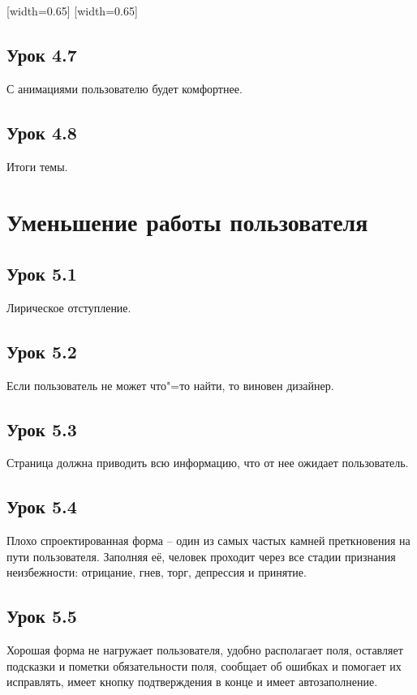 \documentclass[variant=practice]{bsuir}
\begin{document}
[width=0.65\textwidth]
[width=0.65\textwidth]

\subsection{Урок 4.7} С анимациями пользователю будет комфортнее.

\subsection{Урок 4.8} Итоги темы.

\section{Уменьшение работы пользователя}

\subsection{Урок 5.1} Лирическое отступление.

\subsection{Урок 5.2} Если пользователь не может что"=то найти, то виновен
дизайнер.

\subsection{Урок 5.3} Страница должна приводить всю информацию, что от нее
ожидает пользователь.

\subsection{Урок 5.4} Плохо спроектированная форма -- один из самых частых
камней преткновения на пути пользователя. Заполняя её, человек проходит через
все стадии признания неизбежности: отрицание, гнев, торг, депрессия и принятие.

\subsection{Урок 5.5} Хорошая форма не нагружает пользователя, удобно
располагает поля, оставляет подсказки и пометки обязательности поля, сообщает об
ошибках и помогает их исправлять, имеет кнопку подтверждения в конце и имеет
автозаполнение.
\end{document}
